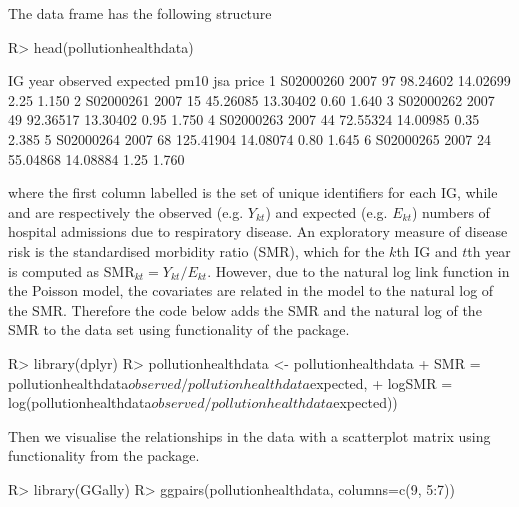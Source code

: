 \documentclass[article, nojss]{jss}
\begin{document}
The data frame  has the following structure

\begin{Schunk}
\begin{Sinput}
R>  head(pollutionhealthdata)
\end{Sinput}
\begin{Soutput}
         IG year observed  expected     pm10  jsa price
1 S02000260 2007       97  98.24602 14.02699 2.25 1.150
2 S02000261 2007       15  45.26085 13.30402 0.60 1.640
3 S02000262 2007       49  92.36517 13.30402 0.95 1.750
4 S02000263 2007       44  72.55324 14.00985 0.35 2.385
5 S02000264 2007       68 125.41904 14.08074 0.80 1.645
6 S02000265 2007       24  55.04868 14.08884 1.25 1.760
\end{Soutput}
\end{Schunk}

where the first column labelled  is the set of unique identifiers for each IG, while  and  are respectively the observed (e.g. $Y_{kt}$) and expected (e.g. $E_{kt}$) numbers of hospital admissions due to respiratory disease. An exploratory measure of disease risk is the standardised morbidity ratio (SMR), which for the $k$th IG and $t$th year is computed as SMR$_{kt}=Y_{kt}/E_{kt}$. However, due to the natural log link function in the Poisson model, the covariates are related in the model to the natural log of the SMR. Therefore the code below adds the SMR and the natural log of the SMR to the data set using functionality of the  package.

\begin{Schunk}
\begin{Sinput}
R>  library(dplyr)
R>  pollutionhealthdata <- pollutionhealthdata %
+           SMR = pollutionhealthdata$observed / pollutionhealthdata$expected, 
+           logSMR = log(pollutionhealthdata$observed / pollutionhealthdata$expected))
\end{Sinput}
\end{Schunk}


Then we visualise the relationships in the data with a scatterplot matrix using functionality from the  package.

\begin{Schunk}
\begin{Sinput}
R>  library(GGally)
R>  ggpairs(pollutionhealthdata, columns=c(9, 5:7))
\end{Sinput}
\end{Schunk}
\end{document}
